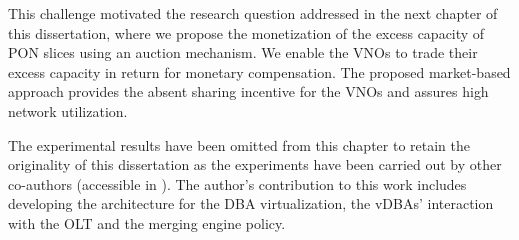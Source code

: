 This challenge motivated the research question addressed in the next chapter of this dissertation, where we propose the monetization of the excess capacity of \ac{PON} slices using an auction mechanism. We enable the \acp{VNO} to trade their excess capacity in return for monetary compensation. The proposed market-based approach provides the absent sharing incentive for the \acp{VNO} and assures high network utilization.

The experimental results have been omitted from this chapter to retain the originality of this dissertation as the experiments have been carried out by other co-authors (accessible in \cite{Elrasad:17}). The author's contribution to this work includes developing the architecture for the \ac{DBA} virtualization, the \acp{vDBA}' interaction with the \ac{OLT} and the merging engine policy.







    


